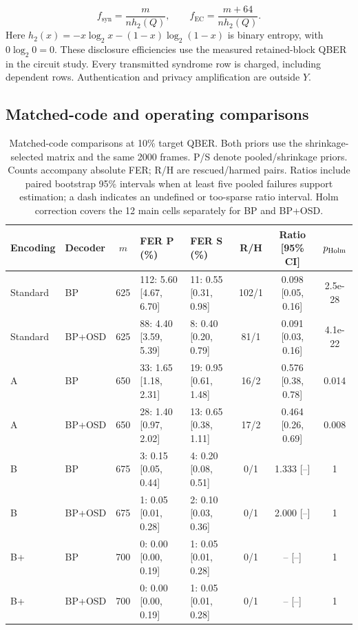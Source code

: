 \begin{equation}
 f_{\mathrm{syn}}=\frac{m}{nh_2(Q)},\qquad
 f_{\mathrm{EC}}=\frac{m+64}{nh_2(Q)}.
 \label{eq:efficiency}
\end{equation}
Here $h_2(x)=-x\log_2x-(1-x)\log_2(1-x)$ is binary entropy, with $0\log_2 0=0$.
These disclosure efficiencies use the measured retained-block QBER in the
circuit study. Every transmitted syndrome row is charged, including dependent
rows. Authentication and privacy amplification are outside $Y$.
\subsection{Matched-code and operating comparisons}
\begin{table}[htbp]
\centering
\small\setlength{\tabcolsep}{3.2pt}
\caption{Matched-code comparisons at 10\% target QBER. Both priors use the shrinkage-selected matrix and the same 2000 frames. P/S denote pooled/shrinkage priors. Counts accompany absolute FER; R/H are rescued/harmed pairs. Ratios include paired bootstrap 95\% intervals when at least five pooled failures support estimation; a dash indicates an undefined or too-sparse ratio interval. Holm correction covers the 12 main cells separately for BP and BP+OSD.}
\label{tab:matched}
\begin{tabular}{@{}llcllccc@{}}
\toprule
Encoding & Decoder & $m$ & FER P (\%) & FER S (\%) & R/H & Ratio [95\% CI] & $p_{\rm Holm}$ \\
\midrule
Standard & BP & 625 & 112: 5.60 [4.67, 6.70] & 11: 0.55 [0.31, 0.98] & 102/1 & 0.098 [0.05, 0.16] & 2.5e-28 \\
Standard & BP+OSD & 625 & 88: 4.40 [3.59, 5.39] & 8: 0.40 [0.20, 0.79] & 81/1 & 0.091 [0.03, 0.16] & 4.1e-22 \\
A & BP & 650 & 33: 1.65 [1.18, 2.31] & 19: 0.95 [0.61, 1.48] & 16/2 & 0.576 [0.38, 0.78] & 0.014 \\
A & BP+OSD & 650 & 28: 1.40 [0.97, 2.02] & 13: 0.65 [0.38, 1.11] & 17/2 & 0.464 [0.26, 0.69] & 0.008 \\
B & BP & 675 & 3: 0.15 [0.05, 0.44] & 4: 0.20 [0.08, 0.51] & 0/1 & 1.333 [--] & 1 \\
B & BP+OSD & 675 & 1: 0.05 [0.01, 0.28] & 2: 0.10 [0.03, 0.36] & 0/1 & 2.000 [--] & 1 \\
B+ & BP & 700 & 0: 0.00 [0.00, 0.19] & 1: 0.05 [0.01, 0.28] & 0/1 & -- [--] & 1 \\
B+ & BP+OSD & 700 & 0: 0.00 [0.00, 0.19] & 1: 0.05 [0.01, 0.28] & 0/1 & -- [--] & 1 \\
\bottomrule
\end{tabular}
\end{table}
